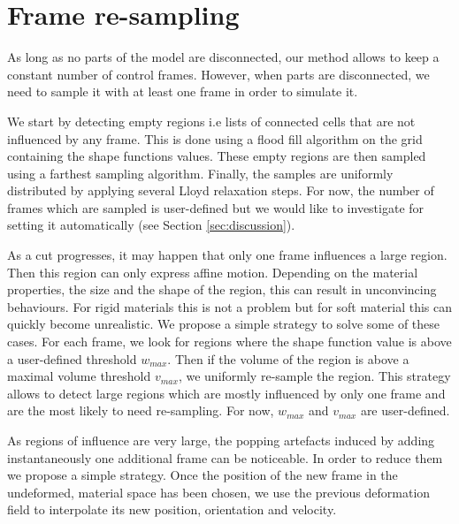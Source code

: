
\section{Frame re-sampling} \label{sec:resampling}
As long as no parts of the model are disconnected, our method allows to keep a constant number of control frames. However, when parts are disconnected, we need to sample it with at least one frame in order to simulate it. 

We start by detecting empty regions i.e lists of connected cells that are not influenced by any frame. This is done using a flood fill algorithm on the grid containing the shape functions values. These empty regions are then sampled using a farthest sampling algorithm. Finally, the samples are uniformly distributed by applying several Lloyd relaxation steps. For now, the number of frames which are sampled is user-defined but we would like to investigate for setting it automatically (see Section \ref{sec:discussion}). 

As a cut progresses, it may happen that only one frame influences a large region. Then this region can only express affine motion. Depending on the material properties, the size and the shape of the region, this can result in unconvincing behaviours. For rigid materials this is not a problem but for soft material this can quickly become unrealistic. We propose a simple strategy to solve some of these cases. For each frame, we look for regions where the shape function value is above a user-defined threshold $w_{max}$. Then if the volume of the region is above a maximal volume threshold $v_{max}$, we uniformly re-sample the region. This strategy allows to detect large regions which are mostly influenced by only one frame and are the most likely to need re-sampling. For now, $w_{max}$ and $v_{max}$ are user-defined.

As regions of influence are very large, the popping artefacts induced by adding instantaneously one additional frame can be noticeable. In order to reduce them we propose a simple strategy. Once the position of the new frame in the undeformed, material space has been chosen, we use the previous deformation field to interpolate its new position, orientation and velocity.


